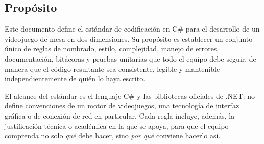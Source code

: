 \subsection{Propósito}

Este documento define el estándar de codificación en C\# para el desarrollo de un videojuego de mesa en dos dimensiones. Su propósito es establecer un conjunto único de reglas de nombrado, estilo, complejidad, manejo de errores, documentación, bitácoras y pruebas unitarias que todo el equipo debe seguir, de manera que el código resultante sea consistente, legible y mantenible independientemente de quién lo haya escrito.

El alcance del estándar es el lenguaje C\# y las bibliotecas oficiales de .NET: no define convenciones de un motor de videojuegos, una tecnología de interfaz gráfica o de conexión de red en particular. Cada regla incluye, además, la justificación técnica o académica en la que se apoya, para que el equipo comprenda no solo \emph{qué} debe hacer, sino \emph{por qué} conviene hacerlo así.
